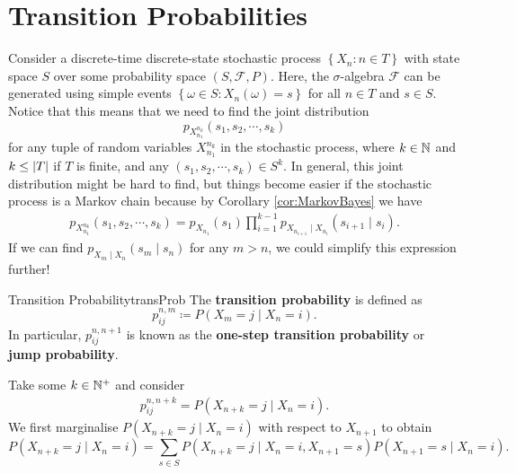 \documentclass[math, code]{amznotes}
\theoremstyle{remark}
\begin{document}
\section{Transition Probabilities}
Consider a discrete-time discrete-state stochastic process $\left\{X_n \colon n \in T\right\}$ with state space $S$ over some probability space $\left(S, \mathcal{F}, P\right)$. Here, the $\sigma$-algebra $\mathcal{F}$ can be generated using simple events $\left\{\omega \in S \colon X_n\left(\omega\right) = s\right\}$ for all $n \in T$ and $s \in S$. Notice that this means that we need to find the joint distribution 
\begin{equation*}
    p_{X_{n_1}^{n_k}}\left(s_1, s_2, \cdots, s_k\right)
\end{equation*}
for any tuple of random variables $X_{n_1}^{n_k}$ in the stochastic process, where $k \in \mathbb{N}$ and $k \leq {\left\lvert {T} \right\rvert}$ if $T$ is finite, and any $\left(s_1, s_2, \cdots, s_k\right) \in S^k$. In general, this joint distribution might be hard to find, but things become easier if the stochastic process is a Markov chain because by Corollary \ref{cor:MarkovBayes} we have
\begin{align*}
    p_{X_{n_1}^{n_k}}\left(s_1, s_2, \cdots, s_k\right) = p_{X_{n_1}}\left(s_1\right)\prod_{i = 1}^{k - 1}p_{X_{n_{i + 1}} \mid X_{n_i}}\left(s_{i + 1} \mid s_i\right).
\end{align*}
If we can find $p_{X_m \mid X_n}\left(s_m \mid s_n\right)$ for any $m > n$, we could simplify this expression further! 
\begin{dfnbox}{Transition Probability}{transProb}
    The {\color{red} \textbf{transition probability}} is defined as 
    \begin{equation*}
        p_{ij}^{n, m} \coloneqq P\left(X_{m} = j \mid X_n = i\right).
    \end{equation*}
    In particular, $p_{ij}^{n, n + 1}$ is known as the {\color{red} \textbf{one-step transition probability}} or {\color{red} \textbf{jump probability}}.
\end{dfnbox}
Take some $k \in \mathbb{N}^+$ and consider
\begin{align*}
    p_{ij}^{n, n + k} = P\left(X_{n + k} = j \mid X_n = i\right).
\end{align*}
We first marginalise $P\left(X_{n + k} = j \mid X_n = i\right)$ with respect to $X_{n + 1}$ to obtain
\begin{equation*}
    P\left(X_{n + k} = j \mid X_n = i\right) = \sum_{s \in S}P\left(X_{n + k} = j \mid X_n = i, X_{n + 1} = s\right)P\left(X_{n + 1} = s \mid X_n = i\right).
\end{equation*}
\end{document}
